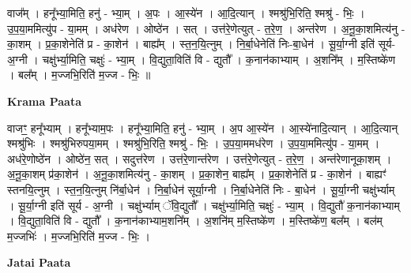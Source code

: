 \documentclass[17pt]{extarticle}
\begin{document}
वाज᳚म् । हनू᳚भ्या॒मिति॒ हनु॑ - भ्या॒म् । अ॒पः । आ॒स्ये॑न । आ॒दि॒त्यान् । श्मश्रु॑भि॒रिति॒ श्मश्रु॑ - भिः॒ । उ॒प॒या॒ममित्यु॑प - या॒मम् । अध॑रेण । ओष्ठे॑न । सत् । उत्त॑रे॒णेत्युत् - त॒रे॒ण॒ । अन्त॑रेण । अ॒नू॒का॒शमित्य॑नु - का॒शम् । प्र॒का॒शेनेति॑ प्र - का॒शेन॑ । बाह्य᳚म् । स्त॒न॒यि॒त्नुम् । नि॒र्बा॒धेनेति॑ निः-बा॒धेन॑ । सू॒र्या॒ग्नी इति॑ सूर्य-अ॒ग्नी । चक्षु॑र्भ्या॒मिति॒ चक्षुः॑ - भ्या॒म् । वि॒द्युता॒विति॑ वि - द्युतौ᳚ । क॒नान॑काभ्याम् । अ॒शनि᳚म् । म॒स्तिष्के॑ण । बल᳚म् । म॒ज्जभि॒रिति॑ म॒ज्ज - भिः॒ ॥  \newline


\textbf{Krama Paata} \newline

वाजꣳ॒॒ हनू᳚भ्याम् । हनू᳚भ्याम॒पः । हनू᳚भ्या॒मिति॒ हनु॑ - भ्या॒म् । अ॒प आ॒स्ये॑न । आ॒स्ये॑नादि॒त्यान् । 
आ॒दि॒त्यान् श्मश्रु॑भिः । श्मश्रु॑भिरुपया॒मम् । श्मश्रु॑भि॒रिति॒ श्मश्रु॑ - भिः॒ । उ॒प॒या॒ममध॑रेण । उ॒प॒या॒ममित्यु॑प - या॒मम् । अध॑रे॒णोष्ठे॑न । ओष्ठे॑न॒ सत् । सदुत्त॑रेण । उत्त॑रे॒णान्त॑रेण । उत्त॑रे॒णेत्युत् - त॒रे॒ण॒ । अन्त॑रेणानूका॒शम् । अ॒नू॒का॒शम् प्र॑का॒शेन॑ । अ॒नू॒का॒शमित्य॑नु - का॒शम् । प्र॒का॒शेन॒ बाह्य᳚म् । प्र॒का॒शेनेति॑ प्र - का॒शेन॑ । बाह्यꣳ॑ स्तनयि॒त्नुम् । स्त॒न॒यि॒त्नुम् नि॑र्बा॒धेन॑ । नि॒र्बा॒धेन॑ सूर्या॒ग्नी । नि॒र्बा॒धेनेति॑ निः - बा॒धेन॑ । सू॒र्या॒ग्नी चक्षु॑र्भ्याम् । सू॒र्या॒ग्नी इति॑ सूर्य - अ॒ग्नी । चक्षु॑र्भ्याम् ॅवि॒द्युतौ᳚ । चक्षु॑र्भ्या॒मिति॒ चक्षुः॑ - भ्या॒म् । वि॒द्युतौ॑ क॒नान॑काभ्याम् । वि॒द्युता॒विति॑ वि - द्युतौ᳚ । क॒नान॑काभ्याम॒शनि᳚म् । अ॒शनि॑म् म॒स्तिष्के॑ण । म॒स्तिष्के॑ण॒ बल᳚म् । बल॑म् म॒ज्जभिः॑ । म॒ज्जभि॒रिति॑ म॒ज्ज - भिः॒ । \newline

\textbf{Jatai Paata} \newline
\end{document}
